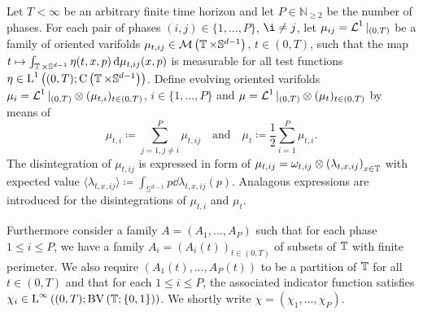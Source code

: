\begin{definition}
	\label{de_giorgi_varifold_solutions_for_mmcf}
	Let $T < \infty $ be an arbitrary finite time horizon and let $ P \in 
	\mathbb{ N }_{ \geq 2 } $ be the number of phases. For each 
	pair of phases $ ( i , j ) \in \{ 1 , \dotsc, P \} $, $ \i \neq j $, let 
	$ \mu_{ i j } = \operatorname{\mathcal{L}}^{ 1 }|_{ ( 0 , T ) } $ be a family of oriented 
	varifolds 
	$ \mu_{ t , ij } \in \mathcal{ M } \left(
		\operatorname{\mathbb{T}} \times \mathbb{ S }^{ d - 1 }
	\right) $,
	$ t \in ( 0 , T ) $, such that the map 
	$ t \mapsto \int_{ \operatorname{\mathbb{T}} \times \mathbb{ S }^{ d - 1 } }
		\eta ( t , x , p )
	\dd{ \mu_{ t ,i j } ( x, p ) }$
	is measurable for all test functions 
	$ \eta \in \operatorname{L}^{ 1 } \left(	
		( 0 , T ) ; \operatorname{C} \left( \operatorname{\mathbb{T}} \times \mathbb{ S }^{ d- 1 } 
		\right) 
	\right) $.
	Define evolving oriented varifolds $ \mu_{ i } = \operatorname{\mathcal{L}}^{ 1 }|_{ ( 0 , T 
	) } \otimes ( \mu_{ t , i } )_{ t \in ( 0 , T ) } $, $ i \in \{ 1, 
	\dotsc, P \} $ and $ \mu = \operatorname{\mathcal{L}}^{ 1 }|_{ ( 0 , T ) } \otimes ( \mu_{ t 
	} )_{ t \in ( 0 , T ) } $ by means of
	\begin{equation*}
		\mu_{ t , i }
		\coloneqq
		\sum_{ j = 1 , j \neq i }^{ P }
			\mu_{ t , i j }
		\quad \text{and} \quad
		\mu_{ t }
		\coloneqq
		\frac{ 1 }{ 2 }
		\sum_{ i = 1 }^{ P }
			\mu_{ t, i }.
	\end{equation*}
	The disintegration of $ \mu_{ t , i j } $ is expressed in form of 
	$ \mu_{ t , i j } = \omega_{ t ,i j } \otimes \left( \lambda _{ t , x , i j 
	} \right)_{ x \in \operatorname{\mathbb{T}} } $ with expected value
	$ \langle \lambda_{ t , x , i j } \rangle 
	\coloneqq
	\int_{ \mathbb{ S }^{ d - 1 } }
		p 
	\dd{ \lambda_{ t , x , i j } ( p ) } $.
	Analagous expressions are introduced for the disintegrations of $ \mu_{ t, 
	i } $ and $ \mu_{ t } $.
	
	Furthermore consider a family 
	$ A = \left( A_{ 1 } , \dotsc , A_{ P } \right) $ 
	such that for each phase $ 1 \leq i \leq P $, we have a family
	$ A_{ i } = ( A_{ i } ( t ) )_{ t \in ( 0 , T ) } $ of subsets of $ 
	\operatorname{\mathbb{T}} $ with finite perimeter. We also require 
	$ \left( A_{ 1 } ( t ) , \dotsc, A_{ P } ( t ) \right) $
	to be a partition of $ \operatorname{\mathbb{T}} $ for all $ t \in ( 0 , T ) $ and 
	that for each $ 1 \leq i \leq P $, the associated indicator function 
	satisfies 
	$ \chi_{ i } \in \operatorname{L}^{ \infty } \left(
		( 0 , T ) ;
		\operatorname{BV} \left( \operatorname{\mathbb{T}} ; \{ 0 , 1 \} \right)
	\right) $.
	We shortly write $ \chi = \left( \chi_{ 1 } , \dotsc, \chi_{ P } \right) $.
	

\end{definition}

